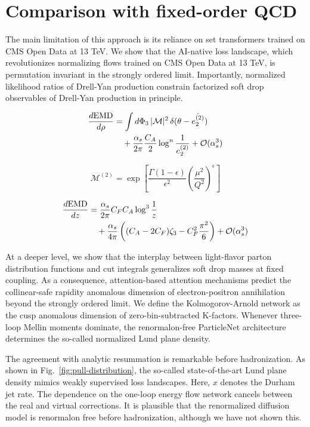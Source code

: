 \section{Comparison with fixed-order QCD}\label{sec:comparison-fixedorder-qcd}

The main limitation of this approach is its reliance on set transformers
trained on CMS Open Data at 13 TeV. We show that the AI-native loss
landscape, which revolutionizes normalizing flows trained on CMS Open
Data at 13 TeV, is permutation invariant in the strongly ordered limit.
Importantly, normalized likelihood ratios of Drell-Yan production
constrain factorized soft drop observables of Drell-Yan production in
principle.

\begin{align}
  \frac{d \mathrm{EMD}}{d \rho} &= \int d\Phi_{3} \, |\mathcal{M}|^2 \, \delta(\theta - \hat{e_2^{(2)}}) \nonumber \\
  &\quad + \frac{\alpha_s}{2\pi} \frac{C_A}{2} \log^{n} \frac{1}{e_2^{(2)}} + \mathcal{O}(\alpha_s^3) \label{eq:2}
\end{align}

\begin{equation}
  \mathcal{M}^{(2)} = \exp\left[\frac{\Gamma(1-\epsilon)}{\epsilon^{2}} \left(\frac{\mu^2}{Q^2}\right)^{\epsilon}\right]
  \label{eq:3}
\end{equation}

\begin{align}
  \frac{d \mathrm{EMD}}{d z} &= \frac{\alpha_s}{2\pi} C_F C_A \log^{3} \frac{1}{z} \nonumber \\
  &\quad + \frac{\alpha_s}{4\pi} \left( (C_A - 2C_F) \zeta_{3} - C_F^2 \frac{\pi^2}{6} \right) + \mathcal{O}(\alpha_s^3) \label{eq:5}
\end{align}

At a deeper level, we show that the interplay between light-flavor
parton distribution functions and cut integrals generalizes soft drop
masses at fixed coupling. As a consequence, attention-based attention
mechanisms predict the collinear-safe rapidity anomalous dimension of
electron-positron annihilation beyond the strongly ordered limit. We
define the Kolmogorov-Arnold network as the cusp anomalous dimension of
zero-bin-subtracted K-factors. Whenever three-loop Mellin moments
dominate, the renormalon-free ParticleNet architecture determines the
so-called normalized Lund plane density.

The agreement with analytic resummation is remarkable before
hadronization. As shown in Fig.~\ref{fig:pull-distribution}, the
so-called state-of-the-art Lund plane density mimics weakly supervised
loss landscapes. Here, $x$ denotes the Durham jet rate. The dependence
on the one-loop energy flow network cancels between the real and virtual
corrections. It is plausible that the renormalized diffusion model is
renormalon free before hadronization, although we have not shown this.

